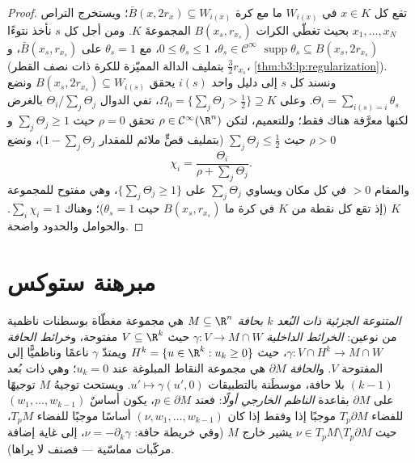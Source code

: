 \begin{proof}
تقع كل $x \in K$ في $W_{i(x)}$ ما مع كرة  $\bar B(x, 2r_x) \subseteq W_{i(x)}$؛ ويستخرج
التراص $x_1, \dots, x_N$ بحيث تغطّي الكرات $B(x_s, r_{x_s})$ المجموعةَ $K$. ومن أجل
كل $s$ نأخذ نتوءًا $\theta_s \in \mathcal
C^\infty$، $0 \leq \theta_s \leq 1$، مع $\theta_s = 1$ على
$\bar B(x_s, r_{x_s})$، و $\operatorname{supp}\theta_s
\subseteq B(x_s, 2r_{x_s})$ (بتمليف الدالة المميّزة للكرة ذات نصف القطر
$\frac32r_{x_s}$، \cref{thm:b3:lp:regularization}). ونسند كل $s$ إلى دليل واحد
$i(s)$ يحقق $B(x_s, 2r_{x_s}) \subseteq W_{i(s)}$ ونضع $\Theta_i = \sum_{i(s) = i}\theta_s$. وعلى 
$\Omega_0 = \{\sum_j\Theta_j > \tfrac12\} \supseteq K$، تفي الدوال $\Theta_i/\sum_j\Theta_j$ بالغرض لكنها معرَّفة هناك فقط؛
وللتعميم، لتكن $\rho \in \mathcal
C^\infty(\R^n)$ تحقق $\rho = 0$ حيث $\sum_j\Theta_j
\geq 1$ و $\rho > 0$
حيث $\sum_j\Theta_j \leq \tfrac12$ (بتمليف قصٍّ ملائم للمقدار $1 - \sum_j\Theta_j$)، ونضع
\[
\chi_i = \frac{\Theta_i}{\rho + \sum_j\Theta_j} .
\]
والمقام $> 0$ في كل مكان ويساوي $\sum_j\Theta_j$ على $\{\sum_j\Theta_j \geq 1\}$،
وهي  مفتوح للمجموعة $K$ (إذ تقع كل نقطة من $K$ في كرة ما
$B(x_s, r_{x_s})$ حيث $\theta_s = 1$)؛ وهناك $\sum_i\chi_i = 1$. والحوامل والحدود
واضحة.
\end{proof}

\section{مبرهنة ستوكس}

\begin{definition}\label{def:b3:forms:boundary}
\emph{المتنوعة الجزئية ذات البُعد $k$ بحافة} $M \subseteq \R^n$ هي مجموعة مغطّاة بوسطنات ناظمية من نوعين:
\emph{الخرائط الداخلية} $\gamma\colon V \to M \cap W$ حيث $V \subseteq \R^k$ مفتوحة، و\emph{خرائط
الحافة} $\gamma\colon V \cap H^k \to M
\cap W$، حيث $H^k = \{u \in \R^k : u_k \geq 0\}$ ويمتدّ $\gamma$ ناعمًا وناظميًّا
إلى المفتوحة $V$. و\emph{الحافة} $\partial M$ هي مجموعة النقاط
المبلوغة عند $u_k = 0$؛ وهي  ذات بُعد $(k-1)$ بلا
حافة، موسطَنة بالتطبيقات $u' \mapsto \gamma(u',
0)$. ويستحث توجيهُ $M$ توجيهًا على
$\partial M$ بقاعدة \emph{الناظم الخارجي أولًا}: فعند $p \in \partial M$،
يكون أساسٌ $(w_1, \dots, w_{k-1})$ للفضاء $T_p\partial M$ موجبًا إذا وفقط إذا
كان $(\nu, w_1, \dots, w_{k-1})$ أساسًا موجبًا للفضاء $T_pM$، حيث $\nu \in T_pM \setminus T_p\partial M$ يشير خارج
$M$ (وفي خريطة حافة: $\nu =
-\partial_k\gamma$، إلى غاية إضافة مركّبات مماسّية ---
فصنف  لا يراها).
\end{definition}

